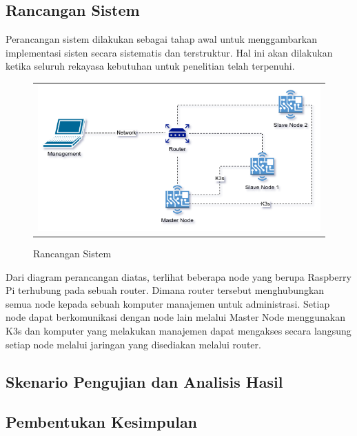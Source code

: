 \subsection{Rancangan Sistem}
Perancangan sistem dilakukan sebagai tahap awal untuk menggambarkan implementasi sisten secara sistematis dan terstruktur. Hal ini akan dilakukan ketika seluruh rekayasa kebutuhan untuk penelitian telah terpenuhi.
\begin{figure}[htb!]
    \centering
    \begin{tabular}{ @{} r @{} }
        \includegraphics[scale=0.7]{pictures/rancangan_sistem.png}\\
    \end{tabular}
    \caption{Rancangan Sistem}
\end{figure}
\FloatBarrier
\noindent
Dari diagram perancangan diatas, terlihat beberapa node yang berupa Raspberry Pi terhubung pada sebuah router. Dimana router tersebut menghubungkan semua node kepada sebuah komputer manajemen untuk administrasi. Setiap node dapat berkomunikasi dengan node lain melalui Master Node menggunakan K3s dan komputer yang melakukan manajemen dapat mengakses secara langsung setiap node melalui jaringan yang disediakan melalui router.
\subsection{Skenario Pengujian dan Analisis Hasil}

\subsection{Pembentukan Kesimpulan}